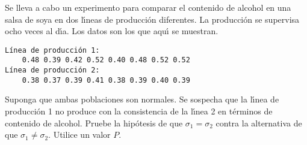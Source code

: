 \begin{enunciado}
 Se lleva a cabo un experimento para comparar el contenido de alcohol
 en una salsa de soya en dos l\'{\i}neas de producci\'on diferentes.
 La producci\'on se supervisa ocho veces al d\'{\i}a.
 Los datos son los que aqu\'{\i} se muestran.
 \begin{verbatim}
Línea de producción 1:
    0.48 0.39 0.42 0.52 0.40 0.48 0.52 0.52
Línea de producción 2:
    0.38 0.37 0.39 0.41 0.38 0.39 0.40 0.39
 \end{verbatim}
 \vspace{-0.5cm}
 Suponga que ambas poblaciones son normales.
 Se sospecha que la l\'{\i}nea de producci\'on 1 no produce
 con la consistencia de la l\'{\i}nea 2 en t\'erminos de contenido de alcohol.
 Pruebe la hip\'otesis de que $\sigma_1 = \sigma_2$ contra la alternativa
 de que $\sigma_1 \neq \sigma_2$. Utilice un valor $P$.
\end{enunciado}

